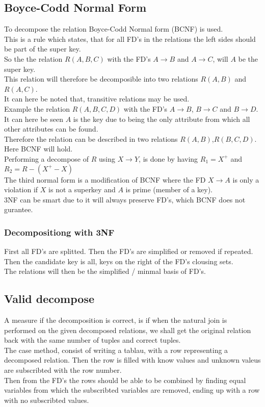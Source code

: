 \documentclass[12pt, a4paper]{article}
\begin{document}
		\subsection{Boyce-Codd Normal Form}
			To decompose the relation Boyce-Codd Normal form (BCNF) is used.\\
			This is a rule which states, that for all FD's in the relations the left sides should be part of the super key.\\
			So the the relation $R(A,B,C)$ with the FD's $A\rightarrow B$ and $A\rightarrow C$, will $A$ be the super key.\\
			This relation will therefore be decomposible into two relations $R(A,B)$ and $R(A,C)$.\\
			It can here be noted that, transitive relations may be used.\\
			Example the relation $R(A,B,C,D)$ with the FD's $A\rightarrow B$, $B\rightarrow C$ and $B\rightarrow D$.\\
			It can here be seen $A$ is the key due to being the only attribute from which all other attributes can be found.\\
			Therefore the relation can be described in two relations $R(A,B)$,$R(B,C,D)$. Here BCNF will hold.\\
			Performing a decompose of $R$ using $X\rightarrow Y$, is done by having $R_1=X^+$ and $R_2=R-(X^+-X)$\\
			The third normal form is a modification of BCNF where the FD $X\rightarrow A$ is only a violation if $X$ is not a superkey and $A$ is prime (member of a key).\\
			3NF can be smart due to it will always preserve FD's, which BCNF does not gurantee.
			\subsubsection{Decompositiong with 3NF}
				First all FD's are splitted. Then the FD's are simplified or removed if repeated.\\
				Then the candidate key is all, keys on the right of the FD's clousing sets.\\
				The relations will then be the simplified / minmal basis of FD's.
		\subsection{Valid decompose}
			A measure if the decomposition is correct, is if when the natural join is performed on the given decomposed relations, we shall get the original relation back with the same number of tuples and correct tuples.\\
			The case method, consist of writing a tablau, with a row representing a decomposed relation. Then the row is filled with know values and unknown valeus are subscribted with the row number.\\
			Then from the FD's the rows should be able to be combined by finding equal variables from which the subscribted variables are removed, ending up with a row with no subscribted values.
\end{document}
